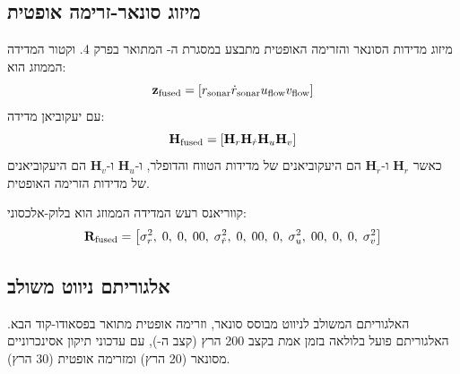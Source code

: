 \subsection{מיזוג סונאר-זרימה אופטית}
\label{sec:ch06_sonar_flow_fusion}

מיזוג מדידות הסונאר והזרימה האופטית מתבצע במסגרת ה- המתואר בפרק 4. וקטור המדידה הממוזג הוא:
\begin{equation}
\mathbf{z}_{\text{fused}} = \left[r_{\text{sonar}} \\ \dot{r}_{\text{sonar}} \\ u_{\text{flow}} \\ v_{\text{flow}}\right]
\label{eq:ch06_fused_measurement}
\end{equation}
עם יעקוביאן מדידה:
\begin{equation}
\mathbf{H}_{\text{fused}} = \left[\mathbf{H}_{r} \\ \mathbf{H}_{\dot{r}} \\ \mathbf{H}_{u} \\ \mathbf{H}_{v}\right]
\label{eq:ch06_fused_jacobian}
\end{equation}
כאשר $\mathbf{H}_{r}$ ו-$\mathbf{H}_{\dot{r}}$ הם היעקוביאנים של מדידות הטווח והדופלר, ו-$\mathbf{H}_{u}$ ו-$\mathbf{H}_{v}$ הם היעקוביאנים של מדידות הזרימה האופטית.

קווריאנס רעש המדידה הממוזג הוא בלוק-אלכסוני:
\begin{equation}
\mathbf{R}_{\text{fused}} = \left[\sigma_r^2,\; 0,\; 0,\; 0 \\ 0,\; \sigma_{\dot{r}}^2,\; 0,\; 0 \\ 0,\; 0,\; \sigma_u^2,\; 0 \\ 0,\; 0,\; 0,\; \sigma_v^2\right]
\label{eq:ch06_fused_covariance}
\end{equation}

\subsection{אלגוריתם ניווט משולב}
\label{sec:ch06_integrated_navigation}

האלגוריתם המשולב לניווט מבוסס סונאר,  וזרימה אופטית מתואר בפסאודו-קוד הבא. האלגוריתם פועל בלולאה בזמן אמת בקצב 200 הרץ (קצב ה-), עם עדכוני תיקון אסינכרוניים מסונאר (20 הרץ) ומזרימה אופטית (30 הרץ).

